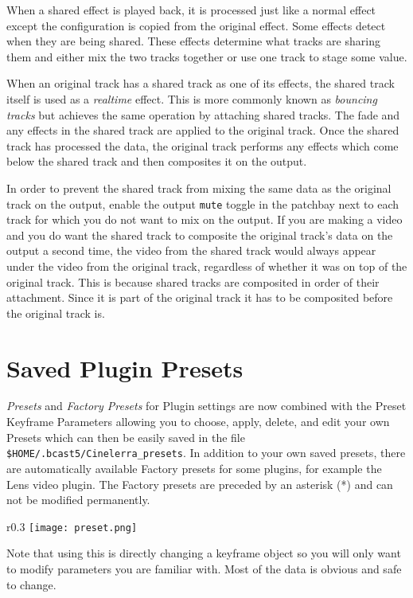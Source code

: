 When a shared effect is played back, it is processed just like a normal effect except the configuration is copied from the original effect. Some effects detect when they are being shared. These effects determine what tracks are sharing them and either mix the two tracks together or use one track to stage some value.

When an original track has a shared track as one of its effects, the shared track itself is used as a \textit{realtime} effect. This is more commonly known as \textit{bouncing tracks} but \CGG{} achieves the same operation by attaching shared tracks. The fade and any effects in the shared track are applied to the original track. Once the shared track has processed the data, the original track performs any effects which come below the shared track and then composites it on the output.

In order to prevent the shared track from mixing the same data as the original track on the output, enable the output \texttt{mute} toggle in the patchbay next to each track for which you do not want to mix on the output. If you are making a video and you do want the shared track to composite the original track's data on the output a second time, the video from the shared track would always appear under the video from the original track, regardless of whether it was on top of the original track. This is because shared tracks are composited in order of their attachment. Since it is part of the original track it has to be composited before the original track is.

\section{Saved Plugin Presets}%
\label{sec:saved_plugin_preset}

\textit{Presets} and \textit{Factory Presets} for Plugin settings are now combined with the Preset Keyframe Parameters allowing you to choose, apply, delete, and edit your own Presets which can then be easily saved in the file \texttt{\$HOME/.bcast5/Cinelerra\_presets}. In addition to your own saved presets, there are automatically available Factory presets for some plugins, for example the Lens video plugin. The Factory presets are preceded by an asterisk (*) and can not be modified permanently.

\begin{wrapfigure}[4]{r}{0.3\linewidth}
    \vspace{-2ex}
    \centering
    \texttt{[image: preset.png]}
\end{wrapfigure}
Note that using this is directly changing a keyframe object so you will only want to modify parameters you are familiar with. Most of the data is obvious and safe to change.

